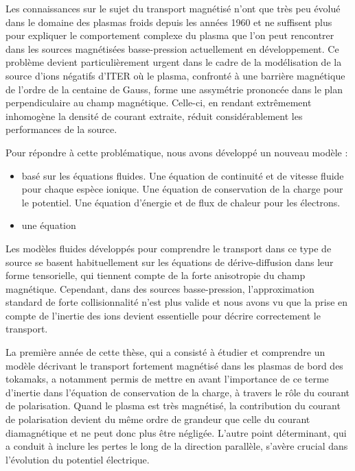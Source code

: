 Les connaissances sur le sujet du transport magnétisé n'ont que très peu évolué
dans le domaine des plasmas froids depuis les années 1960 et ne suffisent plus
pour expliquer le comportement complexe du plasma que l'on peut rencontrer dans
les sources magnétisées basse-pression actuellement en développement.
Ce problème devient particulièrement urgent dans le cadre de la modélisation de
la source d'ions négatifs d'ITER où le plasma, confronté à une barrière
magnétique de l'ordre de la centaine de Gauss, forme une assymétrie prononcée
dans le plan perpendiculaire au champ magnétique. Celle-ci, en rendant
extrêmement inhomogène la densité de courant extraite, réduit considérablement
les performances de la source.

Pour répondre à cette problématique, nous avons développé un nouveau modèle :

\begin{itemize}
  \item basé sur les équations fluides. Une équation de continuité et de vitesse
  fluide pour chaque espèce ionique. Une équation de conservation de la charge
  pour le potentiel. Une équation d'énergie et de flux de chaleur pour les
  électrons.
  \item une équation 
\end{itemize} 

Les modèles fluides développés pour comprendre le transport dans ce type de
source se basent habituellement sur les équations de dérive-diffusion dans leur
forme tensorielle, qui tiennent compte de la forte anisotropie du champ
magnétique.
Cependant, dans des sources basse-pression,
l'approximation standard de forte collisionnalité n'est plus
valide et nous avons vu que la prise en compte de l'inertie des ions devient
essentielle pour décrire correctement le transport. 

La première année de cette thèse, qui a consisté à étudier et comprendre un
modèle décrivant le transport fortement magnétisé dans les plasmas de
bord des tokamaks, a notamment permis de mettre en avant l'importance de ce
terme d'inertie dans l'équation de conservation de la charge, à travers le rôle
du courant de polarisation.
Quand le plasma est très magnétisé, la contribution du courant de polarisation
devient du même ordre de grandeur que celle du courant diamagnétique et ne
peut donc plus être négligée. L'autre point déterminant, qui a conduit à
inclure les pertes le long de la direction parallèle, s'avère crucial dans
l'évolution du potentiel électrique.

